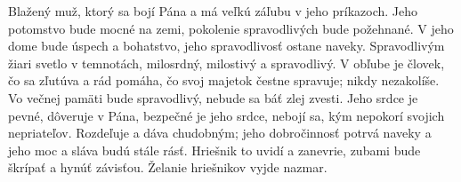 Blažený muž, ktorý sa bojí Pána
a má veľkú záľubu v jeho príkazoch.
\versseparator
Jeho potomstvo bude mocné na zemi,
pokolenie spravodlivých bude požehnané.
\versseparator
V jeho dome bude úspech a bohatstvo,
jeho spravodlivosť ostane naveky.
\versseparator
Spravodlivým žiari svetlo v temnotách,
milosrdný, milostivý a spravodlivý.
\versseparator
V obľube je človek, čo sa zľutúva a rád pomáha,
čo svoj majetok čestne spravuje;
nikdy nezakolíše.
\versseparator
Vo večnej pamäti bude spravodlivý,
nebude sa báť zlej zvesti.
\versseparator
Jeho srdce je pevné, dôveruje v Pána,
bezpečné je jeho srdce, nebojí sa,
kým nepokorí svojich nepriateľov.
\versseparator
Rozdeľuje a dáva chudobným;
jeho dobročinnosť potrvá naveky
a jeho moc a sláva budú stále rásť.
\versseparator
Hriešnik to uvidí a zanevrie,
zubami bude škrípať a hynúť závisťou.
Želanie hriešnikov vyjde nazmar.